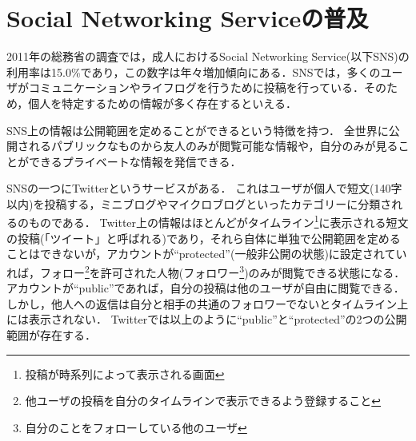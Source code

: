 \section{Social Networking Serviceの普及}
2011年の総務省の調査\cite{micwhitepaper24}では，成人におけるSocial Networking Service(以下SNS)の利用率は15.0\%であり，この数字は年々増加傾向にある．SNSでは，多くのユーザがコミュニケーションやライフログを行うために投稿を行っている．そのため，個人を特定するための情報が多く存在するといえる．

SNS上の情報は公開範囲を定めることができるという特徴を持つ．
全世界に公開されるパブリックなものから友人のみが閲覧可能な情報や，自分のみが見ることができるプライベートな情報を発信できる．

SNSの一つにTwitterというサービスがある．
これはユーザが個人で短文(140字以内)を投稿する，ミニブログやマイクロブログといったカテゴリーに分類されるのものである．
Twitter上の情報はほとんどがタイムライン\footnote{投稿が時系列によって表示される画面}に表示される短文の投稿(「ツイート」と呼ばれる)であり，それら自体に単独で公開範囲を定めることはできないが，アカウントが``protected''(一般非公開の状態)に設定されていれば，フォロー\footnote{他ユーザの投稿を自分のタイムラインで表示できるよう登録すること}を許可された人物(フォロワー\footnote{自分のことをフォローしている他のユーザ})のみが閲覧できる状態になる．
アカウントが``public''であれば，自分の投稿は他のユーザが自由に閲覧できる．しかし，他人への返信は自分と相手の共通のフォロワーでないとタイムライン上には表示されない．
Twitterでは以上のように``public''と``protected''の2つの公開範囲が存在する．
\newpage
